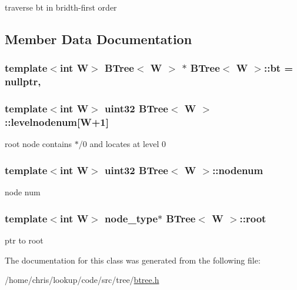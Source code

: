 traverse bt in bridth-\/first order 



\subsection{Member Data Documentation}
\hypertarget{classBTree_abb6c1b3f9b49697267b44ed7769d83bb}{
\subsubsection[{bt}]{\setlength{\rightskip}{0pt plus 5cm}template$<$int W$>$ {\bf B\-Tree}$<$ {\bf W} $>$ $\ast$ {\bf B\-Tree}$<$ {\bf W} $>$\-::bt = nullptr\hspace{0.3cm}{\ttfamily [static]}, {\ttfamily [private]}}}\label{classBTree_abb6c1b3f9b49697267b44ed7769d83bb}
\hypertarget{classBTree_add8631b7a3146b921cc78e9c462b6ca0}{
\subsubsection[{levelnodenum}]{\setlength{\rightskip}{0pt plus 5cm}template$<$int W$>$ {\bf uint32} {\bf B\-Tree}$<$ {\bf W} $>$\-::levelnodenum\mbox{[}{\bf W}+1\mbox{]}\hspace{0.3cm}{\ttfamily [private]}}}\label{classBTree_add8631b7a3146b921cc78e9c462b6ca0}


root node contains $\ast$/0 and locates at level 0 

\hypertarget{classBTree_a2a4d4cc686f03e8685f5271484385772}{
\subsubsection[{nodenum}]{\setlength{\rightskip}{0pt plus 5cm}template$<$int W$>$ {\bf uint32} {\bf B\-Tree}$<$ {\bf W} $>$\-::nodenum\hspace{0.3cm}{\ttfamily [private]}}}\label{classBTree_a2a4d4cc686f03e8685f5271484385772}


node num 

\hypertarget{classBTree_a813c0a8e677ed4e0dd3a49da8031782b}{
\subsubsection[{root}]{\setlength{\rightskip}{0pt plus 5cm}template$<$int W$>$ {\bf node\-\_\-type}$\ast$ {\bf B\-Tree}$<$ {\bf W} $>$\-::root\hspace{0.3cm}{\ttfamily [private]}}}\label{classBTree_a813c0a8e677ed4e0dd3a49da8031782b}


ptr to root 



The documentation for this class was generated from the following file\-:\begin{DoxyCompactItemize}
\item 
/home/chris/lookup/code/src/tree/\hyperlink{btree_8h}{btree.\-h}\end{DoxyCompactItemize}
